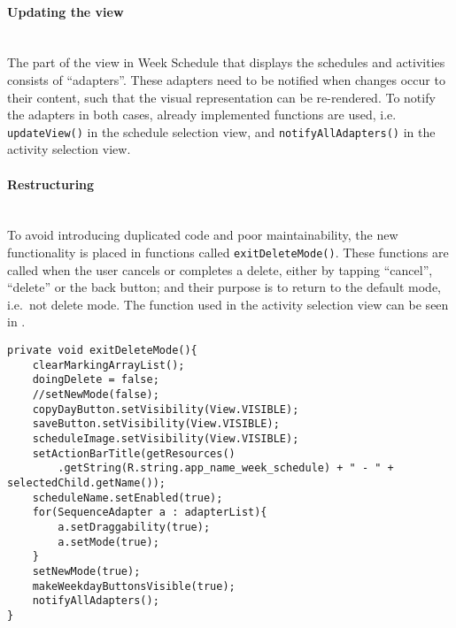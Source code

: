 \paragraph{Updating the view}\hfill\\
The part of the view in Week Schedule that displays the schedules and activities consists of \enquote{adapters}.
These adapters need to be notified when changes occur to their content, such that the visual representation can be re-rendered.
To notify the adapters in both cases, already implemented functions are used, i.e. \texttt{updateView()} in the schedule selection view, and \texttt{notifyAllAdapters()} in the activity selection view.

\paragraph{Restructuring} \hfill\\
To avoid introducing duplicated code and poor maintainability, the new functionality is placed in functions called \texttt{exitDeleteMode()}.
These functions are called when the user cancels or completes a delete, either by tapping \enquote{cancel}, \enquote{delete} or the back button;
and their purpose is to return to the default mode, i.e.\ not delete mode.
The function used in the activity selection view can be seen in .

\begin{lstlisting}[caption={The \texttt{exitDeleteMode()} function, which returns the application to the default mode}, label={lst:exitdeletemode}]
private void exitDeleteMode(){
    clearMarkingArrayList();
    doingDelete = false;
    //setNewMode(false);
    copyDayButton.setVisibility(View.VISIBLE);
    saveButton.setVisibility(View.VISIBLE);
    scheduleImage.setVisibility(View.VISIBLE);
    setActionBarTitle(getResources()
        .getString(R.string.app_name_week_schedule) + " - " + selectedChild.getName());
    scheduleName.setEnabled(true);
    for(SequenceAdapter a : adapterList){
        a.setDraggability(true);
        a.setMode(true);
    }
    setNewMode(true);
    makeWeekdayButtonsVisible(true);
    notifyAllAdapters();
}
\end{lstlisting}
